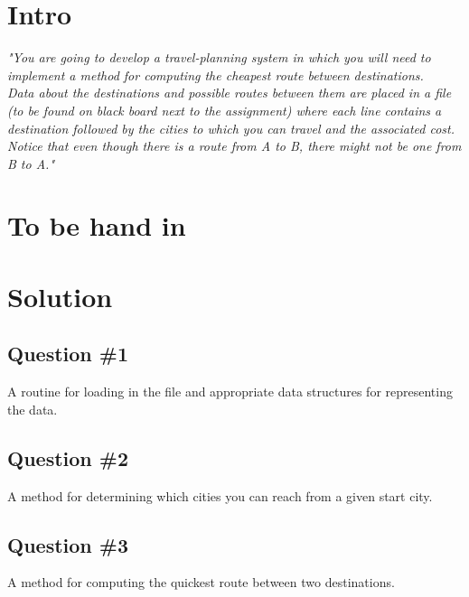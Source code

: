 \section{Intro}
\label{sec:intro}
\textit{"You are going to develop a travel-planning system in which you will need to implement a method for computing the cheapest route between destinations. \\
Data about the destinations and possible routes between them are placed in a file (to be found on black board next to the assignment) where each line contains a destination followed by the cities to which you can travel and the associated cost. \\
Notice that even though there is a route from A to B, there might not be one from B to A."}

\section{To be hand in}


\section{Solution}
\subsection{Question \#1}
A routine for loading in the file and appropriate data structures for representing the data.
\subsection{Question \#2}
A method for determining which cities you can reach from a given start city.
\subsection{Question \#3}
A method for computing the quickest route between two destinations.
